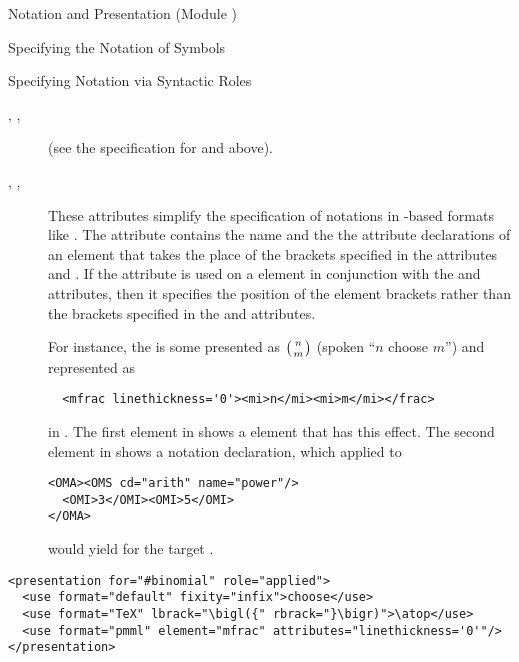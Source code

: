 \begin{tchapter}[id=pres,short=Notation and Presentation]{Notation and Presentation (Module {})}
\begin{tsection}[id=presentation,short=Notation of Symbols]{Specifying the Notation of Symbols}
\begin{tsubsection}[id=pres-declarative]{Specifying Notation via Syntactic Roles}
\begin{description}
\item[{}, {}, {}] (see the specification
  for {} and {} above).
\item[{}, {},
  {}] These attributes simplify the specification of
  notations in {\xml}-based formats like {\mathml}. The
  {} attribute contains the name and the
  {} the attribute declarations of an {\xml} element that takes
  the place of the brackets specified in the attributes {} and {}. If the attribute
  {} is used on a {} element in conjunction with the
  {} and {} attributes, then it
  specifies the position of the element brackets rather than the brackets specified in the
  {} and {}
  attributes.
    
  For instance, the {} is some presented as $\left({n\atop
      m}\right)$ (spoken ``$n$ choose $m$'') and represented as
\begin{lstlisting}
  <mfrac linethickness='0'><mi>n</mi><mi>m</mi></frac>
\end{lstlisting}
  in {\pmathml}. The first {} element in {} shows
  a {} element that has this effect. The second
  {} element in {} shows a notation declaration,
  which applied to
\begin{lstlisting}
<OMA><OMS cd="arith" name="power"/>
  <OMI>3</OMI><OMI>5</OMI>
</OMA>
\end{lstlisting}
  would yield {} for the target {}.
\end{description}


\begin{lstlisting}[label=lst:binomial,
  caption={Presentation for Binomial Coefficients},
  index={presentation,use}]
<presentation for="#binomial" role="applied">
  <use format="default" fixity="infix">choose</use> 
  <use format="TeX" lbrack="\bigl({" rbrack="}\bigr)">\atop</use>
  <use format="pmml" element="mfrac" attributes="linethickness='0'"/>
</presentation>


\end{lstlisting}
\end{tsubsection}
\end{tsection}
\end{tchapter}
